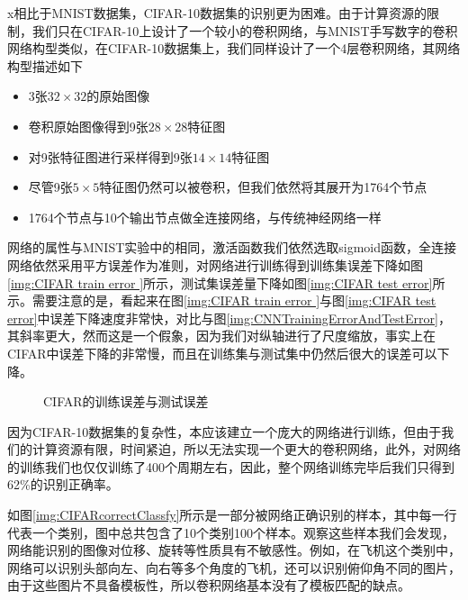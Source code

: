 x相比于MNIST数据集，CIFAR-10数据集的识别更为困难。由于计算资源的限制，我们只在CIFAR-10上设计了一个较小的卷积网络，与MNIST手写数字的卷积网络构型类似，在CIFAR-10数据集上，我们同样设计了一个4层卷积网络，其网络构型描述如下
\begin{itemize}
\item 3张$32\times 32$的原始图像
\item 卷积原始图像得到9张$28\times 28$特征图
\item 对9张特征图进行采样得到9张$14\times 14$特征图
\item 尽管9张$5\times 5$特征图仍然可以被卷积，但我们依然将其展开为1764个节点
\item 1764个节点与10个输出节点做全连接网络，与传统神经网络一样
\end{itemize}

网络的属性与MNIST实验中的相同，激活函数我们依然选取sigmoid函数，全连接网络依然采用平方误差作为准则，对网络进行训练得到训练集误差下降如图\ref{img:CIFAR train error }所示，测试集误差量下降如图\ref{img:CIFAR test error}所示。需要注意的是，看起来在图\ref{img:CIFAR train error }与图\ref{img:CIFAR test error}中误差下降速度非常快，对比与图\ref{img:CNNTrainingErrorAndTestError}，其斜率更大，然而这是一个假象，因为我们对纵轴进行了尺度缩放，事实上在CIFAR中误差下降的非常慢，而且在训练集与测试集中仍然后很大的误差可以下降。

\begin{figure}[htbp]
\centering
\subfigure{\label{img:CIFAR train error }}\addtocounter{subfigure}{-2}
\subfigure{\label{img:CIFAR test error}}\addtocounter{subfigure}{-2}
\caption{CIFAR的训练误差与测试误差}
\vspace{-1em}
\end{figure}

因为CIFAR-10数据集的复杂性，本应该建立一个庞大的网络进行训练，但由于我们的计算资源有限，时间紧迫，所以无法实现一个更大的卷积网络，此外，对网络的训练我们也仅仅训练了400个周期左右，因此，整个网络训练完毕后我们只得到62\%的识别正确率。

如图\ref{img:CIFARcorrectClassfy}所示是一部分被网络正确识别的样本，其中每一行代表一个类别，图中总共包含了10个类别100个样本。观察这些样本我们会发现，网络能识别的图像对位移、旋转等性质具有不敏感性。例如，在飞机这个类别中，网络可以识别头部向左、向右等多个角度的飞机，还可以识别俯仰角不同的图片，由于这些图片不具备模板性，所以卷积网络基本没有了模板匹配的缺点。

